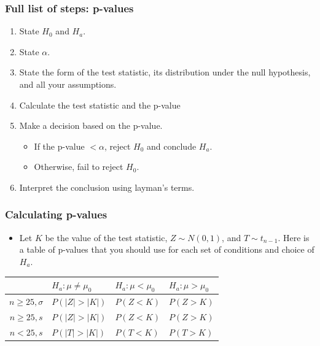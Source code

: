 \documentclass[handout]{beamer}\usepackage{graphicx, color}
\providecommand{\q}{$\quad$ \newline}
\numberwithin{equation}{section}
\begin{document}
\begin{frame}
\frametitle{Full list of steps: p-values}
\begin{enumerate}[1. ]
\item State $H_0$ and $H_a$.
\pause \item State $\alpha$.
\pause \item State the form of the test statistic, its distribution under the null hypothesis, and all your assumptions.
\pause \item Calculate the test statistic and the p-value
\pause \item Make a decision based on the p-value.
\begin{itemize}
\pause \item If the p-value $< \alpha$, reject $H_0$ and conclude $H_a$.
\pause \item Otherwise, fail to reject $H_0$.
\end{itemize}
\pause \item Interpret the conclusion using layman's terms.
\end{enumerate}
\end{frame}

\begin{frame}
\frametitle{Calculating p-values}
\begin{itemize}
\pause \item Let $K$ be the value of the test statistic, $Z \sim N(0,1)$, and $T \sim t_{n-1}$. Here is a table of p-values that you should use for each set of conditions and choice of $H_a$. \q
\end{itemize}
\pause \begin{tabular}{c|lll}
 & $H_a: \mu \ne \mu_0$ & $H_a: \mu < \mu_0$ & $H_a: \mu > \mu_0$  \\ \hline
$n \ge 25, \sigma$ & $P(|Z| > |K|)$ & $P(Z < K)$ & $P(Z > K)$ \\ [2.5ex]
$n \ge 25, s$ & $P(|Z| > |K|)$           & $P(Z < K)$ & $P(Z > K)$\\ [2.5ex]
$n < 25, s$    & $P(|T| > |K|)$           & $P(T < K)$ & $P(T > K)$   \\ [2.5ex]
\end{tabular}
\end{frame}
\end{document}
